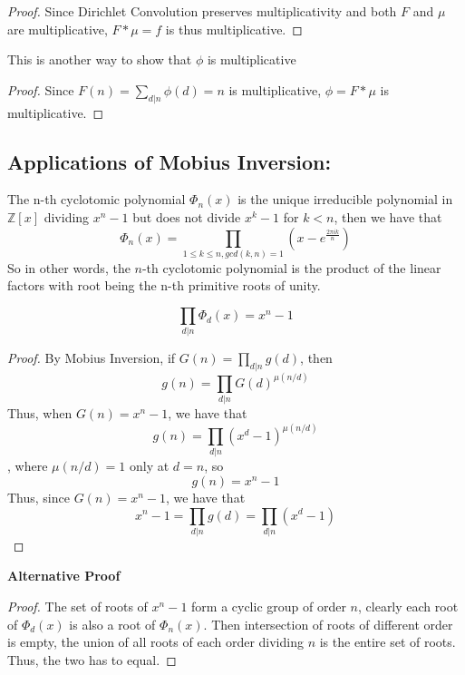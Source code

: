 \begin{proof}
Since Dirichlet Convolution preserves multiplicativity and both $F$ and $\mu$ are multiplicative, $F * \mu = f$ is thus multiplicative.
\end{proof}

\begin{corollary}
This is another way to show that $\phi$ is multiplicative
\end{corollary}

\begin{proof}
Since $F(n) = \sum_{d | n} \phi(d) = n$ is multiplicative, $\phi = F * \mu$ is multiplicative.
\end{proof}

\subsection{Applications of Mobius Inversion:}

\begin{definition}
The n-th cyclotomic polynomial $\Phi_n(x)$ is the unique irreducible polynomial in $\mathbb{Z}[x]$ dividing $x^n - 1$ but does not divide $x^k - 1$ for $k < n$, then we have that
\[\Phi_n(x) = \prod_{1 \leq k \leq n, gcd(k, n) = 1} (x - e^{\frac{2\pi i k }{n}})\]
So in other words, the $n$-th cyclotomic polynomial is the product of the linear factors with root being the n-th primitive roots of unity.
\end{definition}

\begin{proposition}
\[\prod_{d | n} \Phi_d(x) = x^n - 1\]
\end{proposition}

\begin{proof}
By Mobius Inversion, if $G(n) = \prod_{d | n} g(d)$, then
\[g(n) = \prod_{d | n} G(d)^{\mu(n/ d)}\]
Thus, when $G(n) = x^n - 1$, we have that
\[g(n) = \prod_{d | n} (x^d - 1)^{\mu(n/d)}\]
, where $\mu(n / d) = 1$ only at $d = n$, so
\[g(n) = x^n - 1\]
Thus, since $G(n) = x^n - 1$, we have that
\[x^n - 1 = \prod_{d | n} g(d) = \prod_{d | n} (x^d - 1)\]
\end{proof}

{\bf Alternative Proof}
\begin{proof}
The set of roots of $x^n - 1$ form a cyclic group of order $n$, clearly each root of $\Phi_d(x)$ is also a root of $\Phi_n(x)$. Then intersection of roots of different order is empty, the union of all roots of each order dividing $n$ is the entire set of roots. Thus, the two has to equal.
\end{proof}

